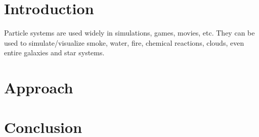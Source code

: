 \section{Introduction}
Particle systems are used widely in simulations, games, movies, etc. They can be used to simulate/visualize smoke, water, fire, chemical reactions, clouds, even entire galaxies and star systems.

\section{Approach}

\section{Conclusion}
